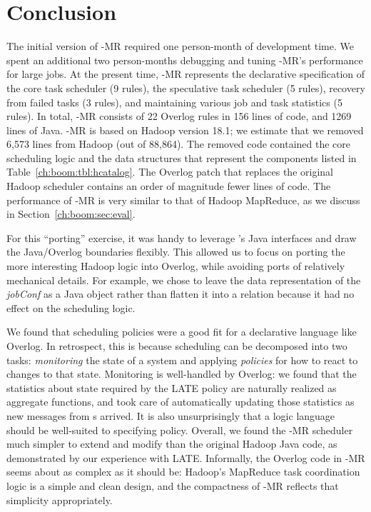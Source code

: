 \section{Conclusion}
The initial version of \BOOM-MR required one person-month of
development time. We spent an additional two person-months debugging
and tuning \BOOM-MR's performance for large jobs. At the present time, 
\BOOM-MR represents the declarative specification of the core task scheduler (9 rules), 
the speculative task scheduler (5 rules), recovery from failed tasks (3 rules), and maintaining various 
job and task statistics (5 rules). In total, \BOOM-MR consists of 22 Overlog rules in 156 lines of 
code, and 1269 lines of Java. \BOOM-MR is based on Hadoop version 18.1; we estimate 
that we removed 6,573 lines from Hadoop (out of 88,864). The removed code contained
the core scheduling logic and the data structures that represent the
components listed in Table~\ref{ch:boom:tbl:hcatalog}. The Overlog patch that
replaces the original Hadoop scheduler contains an order of magnitude
fewer lines of code.  The performance of \BOOM-MR is very similar to
that of Hadoop MapReduce, as we discuss in Section~\ref{ch:boom:sec:eval}.


For this ``porting'' exercise, it was handy to leverage \JOL's Java interfaces
and draw the Java/Overlog boundaries flexibly.  This allowed us to focus on
porting the more interesting Hadoop logic into Overlog, while avoiding ports of
relatively mechanical details.  For example, we chose to leave the data
representation of the \emph{jobConf} as a Java object rather than flatten it
into a relation because it had no effect on the scheduling logic.

We found that scheduling policies were a good fit for a declarative language
like Overlog. In retrospect, this is because scheduling can be decomposed into
two tasks: \emph{monitoring} the state of a system and applying \emph{policies}
for how to react to changes to that state. Monitoring is well-handled by
Overlog: we found that the statistics about {\TT} state required by the LATE
policy are naturally realized as aggregate functions, and \JOL took care of
automatically updating those statistics as new messages from {\TT}s arrived. It
is also unsurprisingly that a logic language should be well-suited to specifying
policy. Overall, we found the \BOOM-MR scheduler much simpler to extend and
modify than the original Hadoop Java code, as demonstrated by our experience
with LATE\@.  Informally, the Overlog code in \BOOM-MR seems about as complex as
it should be: Hadoop's MapReduce task coordination logic is a simple and clean
design, and the compactness of \BOOM-MR reflects that simplicity appropriately.

